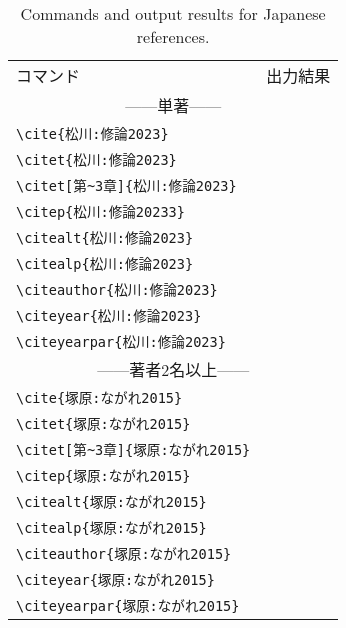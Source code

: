 \begin{table}[t]
    \centering
    \caption{Commands and output results for Japanese references.}
    \label{tab:Japanese}
    \begin{tabular}{ll}
        コマンド &出力結果 \\
        \multicolumn{2}{c}{------単著------} \\
        \verb|\cite{松川:修論2023}|            &\cite{松川:修論2023} \\
        \verb|\citet{松川:修論2023}|           &\citet{松川:修論2023} \\
        \verb|\citet[第~3章]{松川:修論2023}|           &\citet[第~3章]{松川:修論2023} \\
        \verb|\citep{松川:修論20233}|           &\citep{松川:修論2023} \\
        \verb|\citealt{松川:修論2023}|         &\citealt{松川:修論2023} \\
        \verb|\citealp{松川:修論2023}|         &\citealp{松川:修論2023} \\
        \verb|\citeauthor{松川:修論2023}|      &\citeauthor{松川:修論2023} \\
        \verb|\citeyear{松川:修論2023}|        &\citeyear{松川:修論2023} \\
        \verb|\citeyearpar{松川:修論2023}|     &\citeyearpar{松川:修論2023} \\
        \multicolumn{2}{c}{------著者2名以上------} \\
        \verb|\cite{塚原:ながれ2015}|            &\cite{塚原:ながれ2015} \\
        \verb|\citet{塚原:ながれ2015}|           &\citet{塚原:ながれ2015} \\
        \verb|\citet[第~3章]{塚原:ながれ2015}|           &\citet[第~3章]{塚原:ながれ2015} \\
        \verb|\citep{塚原:ながれ2015}|           &\citep{塚原:ながれ2015} \\
        \verb|\citealt{塚原:ながれ2015}|         &\citealt{塚原:ながれ2015} \\
        \verb|\citealp{塚原:ながれ2015}|         &\citealp{塚原:ながれ2015} \\
        \verb|\citeauthor{塚原:ながれ2015}|      &\citeauthor{塚原:ながれ2015} \\
        \verb|\citeyear{塚原:ながれ2015}|        &\citeyear{塚原:ながれ2015} \\
        \verb|\citeyearpar{塚原:ながれ2015}|     &\citeyearpar{塚原:ながれ2015} \\

\end{tabular}
\end{table}
